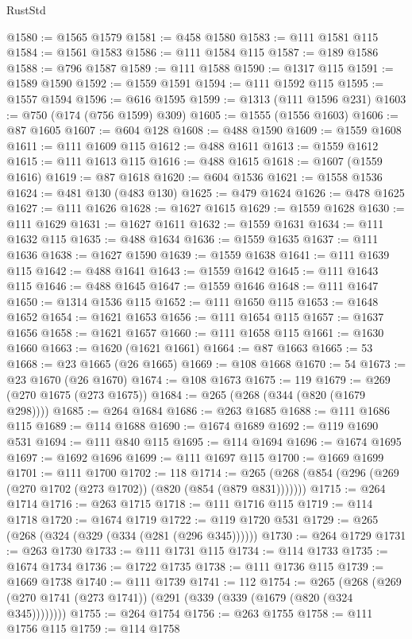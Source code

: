 \begin{lexlean}{RustStd}
\begin{coremodule}
@1580 := @1565 @1579
@1581 := @458 @1580
@1583 := @111 @1581 @115
@1584 := @1561 @1583
@1586 := @111 @1584 @115
@1587 := @189 @1586
@1588 := @796 @1587
@1589 := @111 @1588
@1590 := @1317 @115
@1591 := @1589 @1590
@1592 := @1559 @1591
@1594 := @111 @1592 @115
@1595 := @1557 @1594
@1596 := @616 @1595
@1599 := @1313 (@111 @1596 @231)
@1603 := @750 (@174 (@756 @1599) @309)
@1605 := @1555 (@1556 @1603)
@1606 := @87 @1605
@1607 := @604 @128
@1608 := @488 @1590
@1609 := @1559 @1608
@1611 := @111 @1609 @115
@1612 := @488 @1611
@1613 := @1559 @1612
@1615 := @111 @1613 @115
@1616 := @488 @1615
@1618 := @1607 (@1559 @1616)
@1619 := @87 @1618
@1620 := @604 @1536
@1621 := @1558 @1536
@1624 := @481 @130 (@483 @130)
@1625 := @479 @1624
@1626 := @478 @1625
@1627 := @111 @1626
@1628 := @1627 @1615
@1629 := @1559 @1628
@1630 := @111 @1629
@1631 := @1627 @1611
@1632 := @1559 @1631
@1634 := @111 @1632 @115
@1635 := @488 @1634
@1636 := @1559 @1635
@1637 := @111 @1636
@1638 := @1627 @1590
@1639 := @1559 @1638
@1641 := @111 @1639 @115
@1642 := @488 @1641
@1643 := @1559 @1642
@1645 := @111 @1643 @115
@1646 := @488 @1645
@1647 := @1559 @1646
@1648 := @111 @1647
@1650 := @1314 @1536 @115
@1652 := @111 @1650 @115
@1653 := @1648 @1652
@1654 := @1621 @1653
@1656 := @111 @1654 @115
@1657 := @1637 @1656
@1658 := @1621 @1657
@1660 := @111 @1658 @115
@1661 := @1630 @1660
@1663 := @1620 (@1621 @1661)
@1664 := @87 @1663
@1665 := 53
@1668 := @23 @1665 (@26 @1665)
@1669 := @108 @1668
@1670 := 54
@1673 := @23 @1670 (@26 @1670)
@1674 := @108 @1673
@1675 := 119
@1679 := @269 (@270 @1675 (@273 @1675))
@1684 := @265 (@268 (@344 (@820 (@1679 @298))))
@1685 := @264 @1684
@1686 := @263 @1685
@1688 := @111 @1686 @115
@1689 := @114 @1688
@1690 := @1674 @1689
@1692 := @119 @1690 @531
@1694 := @111 @840 @115
@1695 := @114 @1694
@1696 := @1674 @1695
@1697 := @1692 @1696
@1699 := @111 @1697 @115
@1700 := @1669 @1699
@1701 := @111 @1700
@1702 := 118
@1714 := @265 (@268 (@854 (@296 (@269 (@270 @1702 (@273 @1702)) (@820 (@854 (@879 @831)))))))
@1715 := @264 @1714
@1716 := @263 @1715
@1718 := @111 @1716 @115
@1719 := @114 @1718
@1720 := @1674 @1719
@1722 := @119 @1720 @531
@1729 := @265 (@268 (@324 (@329 (@334 (@281 (@296 @345))))))
@1730 := @264 @1729
@1731 := @263 @1730
@1733 := @111 @1731 @115
@1734 := @114 @1733
@1735 := @1674 @1734
@1736 := @1722 @1735
@1738 := @111 @1736 @115
@1739 := @1669 @1738
@1740 := @111 @1739
@1741 := 112
@1754 := @265
    (@268 (@269 (@270 @1741 (@273 @1741)) (@291 (@339 (@339 (@1679 (@820 (@324 @345))))))))
@1755 := @264 @1754
@1756 := @263 @1755
@1758 := @111 @1756 @115
@1759 := @114 @1758

\end{coremodule}
\end{lexlean}

